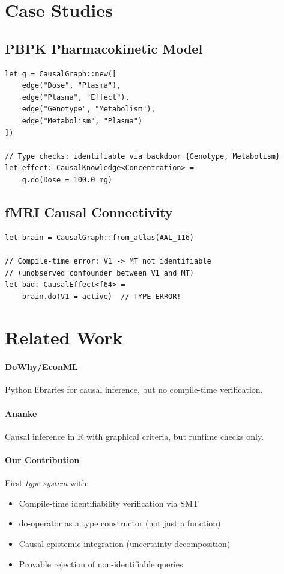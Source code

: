 \documentclass[11pt]{article}
\begin{document}
\section{Case Studies}

\subsection{PBPK Pharmacokinetic Model}
\begin{verbatim}
let g = CausalGraph::new([
    edge("Dose", "Plasma"),
    edge("Plasma", "Effect"),
    edge("Genotype", "Metabolism"),
    edge("Metabolism", "Plasma")
])

// Type checks: identifiable via backdoor {Genotype, Metabolism}
let effect: CausalKnowledge<Concentration> =
    g.do(Dose = 100.0 mg)
\end{verbatim}

\subsection{fMRI Causal Connectivity}
\begin{verbatim}
let brain = CausalGraph::from_atlas(AAL_116)

// Compile-time error: V1 -> MT not identifiable
// (unobserved confounder between V1 and MT)
let bad: CausalEffect<f64> =
    brain.do(V1 = active)  // TYPE ERROR!
\end{verbatim}

\section{Related Work}

\paragraph{DoWhy/EconML} Python libraries for causal inference, but no compile-time verification.

\paragraph{Ananke} Causal inference in R with graphical criteria, but runtime checks only.

\paragraph{Our Contribution} First \emph{type system} with:
\begin{itemize}
\item Compile-time identifiability verification via SMT
\item do-operator as a type constructor (not just a function)
\item Causal-epistemic integration (uncertainty decomposition)
\item Provable rejection of non-identifiable queries
\end{itemize}
\end{document}
